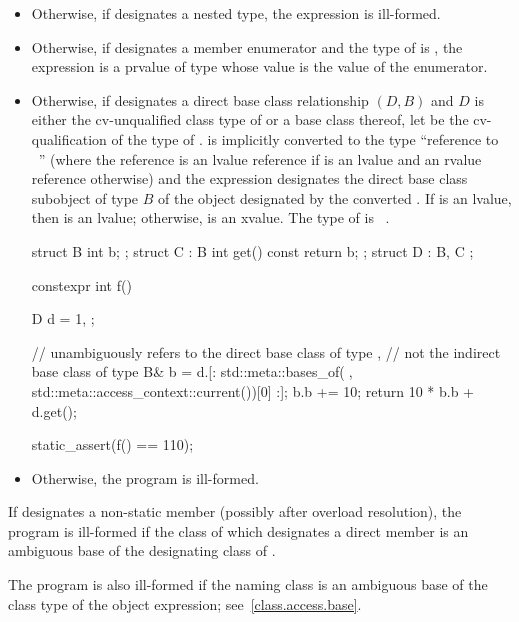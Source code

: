 \begin{itemize}
\item
Otherwise, if  designates a nested type,
the expression  is ill-formed.

\item
Otherwise, if  designates a member enumerator and the type of 
is , the expression  is a prvalue of type 
whose value is the value of the enumerator.

\item
Otherwise, if  designates a direct base class relationship $(D, B)$ and
$D$ is either the cv-unqualified class type of  or a base class thereof,
let \cv{} be the cv-qualification of the type of .
 is implicitly converted to the type ``reference to \cv{}~''
(where the reference is an lvalue reference if  is an lvalue
and an rvalue reference otherwise) and
the expression designates the direct base class subobject of type $B$
of the object designated by the converted .
If  is an lvalue,
then  is an lvalue;
otherwise,  is an xvalue.
The type of  is \cv{}~.
\begin{example}
\begin{codeblock}
struct B {
  int b;
};
struct C : B {
  int get() const { return b; }
};
struct D : B, C { };

constexpr int f() {
  D d = {1, {}};

  //  unambiguously refers to the direct base class of type ,
  // not the indirect base class of type 
  B& b = d.[: std::meta::bases_of(^^D, std::meta::access_context::current())[0] :];
  b.b += 10;
  return 10 * b.b + d.get();
}
static_assert(f() == 110);
\end{codeblock}
\end{example}

\item
Otherwise, the program is ill-formed.
\end{itemize}

\pnum
If  designates a non-static member
(possibly after overload resolution),
the program is ill-formed if the class of which  designates
a direct member is an ambiguous base of
the designating class of .
\begin{note}
The program is also ill-formed if the naming class is an ambiguous base of the class type
of the object expression; see~\ref{class.access.base}.
\end{note}

